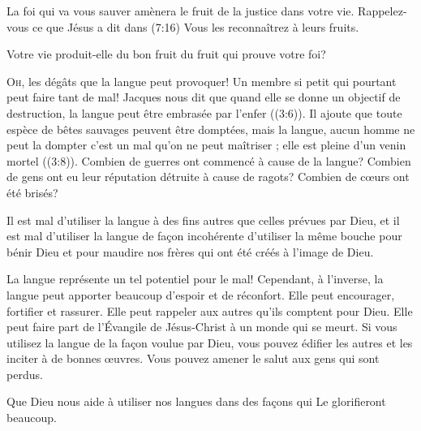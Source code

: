 La foi qui va vous sauver amènera le fruit de la justice dans votre vie.
 Rappelez-vous ce que Jésus a dit dans (7:16)\frcolon{} 
 \Og Vous les reconnaîtrez à leurs fruits. \Fg{}

Votre vie produit-elle du bon fruit \ocadr du fruit qui prouve votre foi? 

\dvrule







\lettrine{O}{h,} les dégâts que la langue peut provoquer!
 Un membre si petit qui pourtant peut faire tant de mal!
 Jacques nous dit que quand elle se donne un objectif de destruction,
 la langue peut être \Og embrasée par l'enfer \Fg{} ((3:6)).
 Il ajoute que toute espèce de bêtes sauvages peuvent être domptées,
 \Og mais la langue, aucun homme ne peut la dompter\frcolon{} c'est un mal
 qu'on ne peut maîtriser ; elle est pleine d'un venin mortel \Fg{}
 ((3:8)).
 Combien de guerres ont commencé à cause de la langue?
 Combien de gens ont eu leur réputation détruite à cause de ragots?
 Combien de c\oe{}urs ont été brisés? 


Il est mal d'utiliser la langue à des fins autres
 que celles prévues par Dieu, et il est mal d'utiliser la langue
 de fa\c{c}on incohérente \ocadr d'utiliser la même bouche pour bénir Dieu
 et pour maudire nos frères qui ont été créés à l'image de Dieu. 

La langue représente un tel potentiel pour le mal!
 Cependant, à l'inverse, la langue peut apporter beaucoup d'espoir
 et de réconfort. Elle peut encourager, fortifier et rassurer.
 Elle peut rappeler aux autres qu'ils comptent pour Dieu.
 Elle peut faire part de l'Évangile 
 de Jésus-Christ à un monde qui se meurt.
 Si vous utilisez la langue de la fa\c{c}on voulue par Dieu,
 vous pouvez édifier les autres et les inciter à de bonnes \oe{}uvres.
 Vous pouvez amener le salut aux gens qui sont perdus. 

Que Dieu nous aide à utiliser nos langues dans des fa\c{c}ons 
 qui Le glorifieront beaucoup. 

\dvrule



